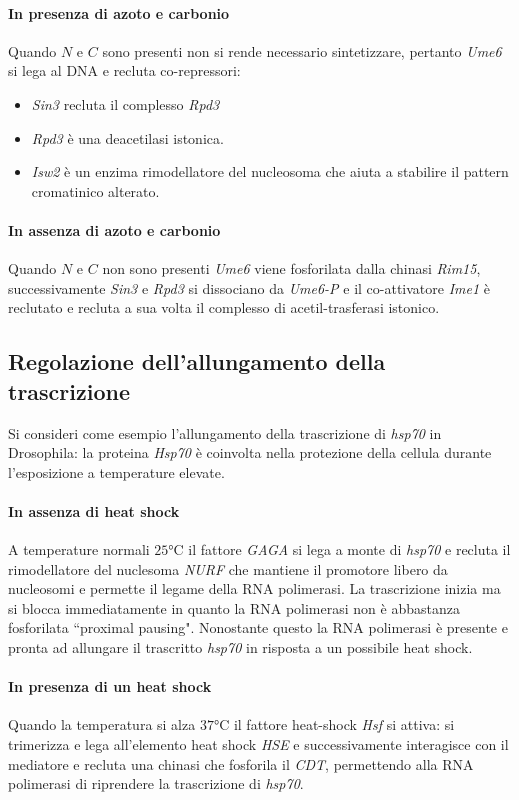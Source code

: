 \paragraph{In presenza di azoto e carbonio}
Quando $N$ e $C$ sono presenti non si rende necessario sintetizzare, pertanto \emph{Ume6} si lega al DNA e recluta co-repressori:
\begin{itemize}
	\item \emph{Sin3} recluta il complesso \emph{Rpd3}
	\item \emph{Rpd3} \`e una deacetilasi istonica.
	\item \emph{Isw2} \`e un enzima rimodellatore del nucleosoma che aiuta a stabilire il pattern cromatinico alterato.
\end{itemize}
\paragraph{In assenza di azoto e carbonio}
Quando $N$ e $C$ non sono presenti \emph{Ume6} viene fosforilata dalla chinasi \emph{Rim15}, successivamente \emph{Sin3} e \emph{Rpd3} si dissociano da \emph{Ume6-P} e il co-attivatore
\emph{Ime1} \`e reclutato e recluta a sua volta il complesso di acetil-trasferasi istonico. 	
\subsection{Regolazione dell'allungamento della trascrizione}
Si consideri come esempio l'allungamento della trascrizione di \emph{hsp70} in Drosophila: la proteina \emph{Hsp70} \`e coinvolta nella protezione della cellula durante l'esposizione
a temperature elevate. 
\paragraph{In assenza di heat shock}
A temperature normali $25$\si{\celsius} il fattore \emph{GAGA} si lega a monte di \emph{hsp70} e recluta il rimodellatore del nuclesoma \emph{NURF} che mantiene il promotore libero 
da nucleosomi e permette il legame della RNA polimerasi. La trascrizione inizia ma si blocca immediatamente in quanto la RNA polimerasi non \`e abbastanza fosforilata ``proximal 
pausing". Nonostante questo la RNA polimerasi \`e presente e pronta ad allungare il trascritto \emph{hsp70} in risposta a un possibile heat shock.
\paragraph{In presenza di un heat shock}
Quando la temperatura si alza $37$\si{\celsius} il fattore heat-shock \emph{Hsf} si attiva: si trimerizza e lega all'elemento heat shock \emph{HSE} e successivamente interagisce con il
mediatore e recluta una chinasi che fosforila il \emph{CDT}, permettendo alla RNA polimerasi di riprendere la trascrizione di \emph{hsp70}. 

